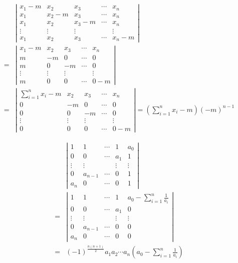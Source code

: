 \documentclass[13pt,fontset=mac]{ctexbeamer}
\begin{document}
\begin{frame}
	\small{
\begin{align*}
& 	\left|\begin{array}{ccccc}
		x_{1}-m & x_{2} & x_{3} & \cdots & x_{n} \\
		x_{1} & x_{2}-m & x_{3} & \cdots & x_{n} \\
		x_{1} & x_{2} & x_{3}-m & \cdots & x_{n} \\
		\vdots & \vdots & \vdots & & \vdots \\
		x_{1} & x_{2} & x_{3} & \cdots & x_{n}-m
	\end{array}\right|\\[-3pt]
= & \left|\begin{array}{ccccc}
		x_{1}-m & x_{2} & x_{3} & \cdots & x_{n} \\
		m & -m & 0 & \cdots & 0 \\
		m & 0 & -m & \cdots & 0 \\
		\vdots & \vdots & \vdots & & \vdots \\
		m & 0 & 0 & \cdots & 0-m
	\end{array}\right|\\[-3pt]
 = & \left|\begin{array}{ccccc}
		\sum_{i=1}^{n} x_{i}-m & x_{2} & x_{3} & \cdots & x_{n} \\
		0 & -m & 0 & \cdots & 0 \\
		0 & 0 & -m & \cdots & 0 \\
		\vdots & \vdots & \vdots & & \vdots \\
		0 & 0 & 0 & \cdots & 0-m
	\end{array}\right|=\left(\sum_{i=1}^{n} x_{i}-m\right)(-m)^{n-1}
\end{align*}}
\end{frame}

\begin{frame}
\begin{align*}
& 	\left|\begin{array}{ccccc}
		1 & 1 & \cdots & 1 & a_{0} \\
		0 & 0 & \cdots & a_{1} & 1 \\
		\vdots & \vdots & & \vdots & \vdots \\
		0 & a_{n-1} & \cdots & 0 & 1 \\
		a_{n} & 0 & \cdots & 0 & 1
	\end{array}\right| \\[8pt]
= & \left|\begin{array}{ccccc}
		1 & 1 & \cdots & 1 & a_{0}-\sum_{i=1}^{n} \frac{1}{a_{i}} \\
		0 & 0 & \cdots & a_{1} & 0 \\
		\vdots & \vdots & & \vdots & \vdots \\
		0 & a_{n-1} & \cdots & 0 & 0 \\
		a_{n} & 0 & \cdots & 0 & 0
	\end{array}\right|  \\[8pt]
= & (-1)^{\frac{n(n+1)}{2}} a_{1} a_{2} \cdots a_{n}\left(a_{0}-\sum_{i=1}^{n} \frac{1}{a_{i}}\right)
\end{align*}
\end{frame}
\end{document}
